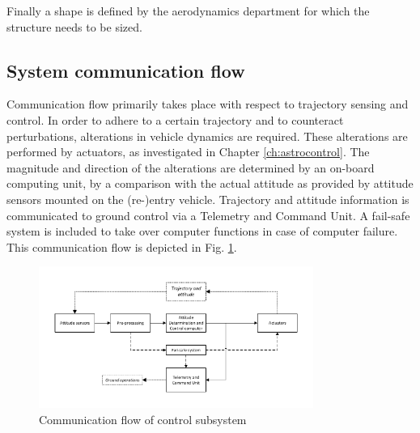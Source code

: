 Finally a shape is defined by the aerodynamics department for which the structure needs to be sized. 

\subsection{System communication flow} \label{sec:comflow}
Communication flow primarily takes place with respect to trajectory sensing and control. In order to adhere to a certain trajectory and to counteract perturbations, alterations in vehicle dynamics are required. These alterations are performed by actuators, as investigated in Chapter \ref{ch:astrocontrol}. The magnitude and direction of the alterations are determined by an on-board computing unit, by a comparison with the actual attitude as provided by attitude sensors mounted on the (re-)entry vehicle. Trajectory and attitude information is communicated to ground control via a Telemetry and Command Unit. A fail-safe system is included to take over computer functions in case of computer failure. This communication flow is depicted in Fig. \ref{fig:comflow}.

\begin{figure}[H]
\centering
\includegraphics[width = 0.8\textwidth]{Figure/CommunicationChart.pdf}
\caption{Communication flow of control subsystem}
\label{fig:comflow}
\end{figure}

